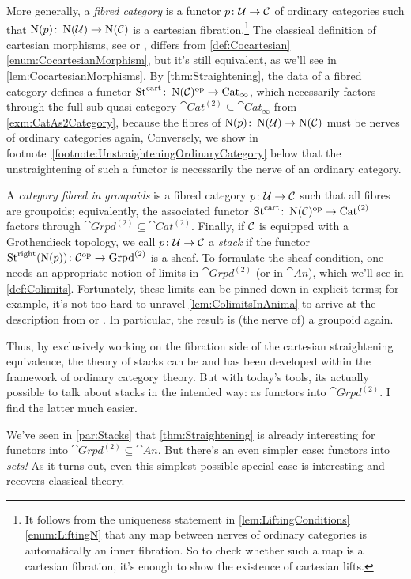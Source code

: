 \begin{numpar}
	More generally, a \emph{fibred category} is a functor $p\colon \mathcal{U}\rightarrow \mathcal{C}$ of ordinary categories such that $\operatorname{N}(p)\colon \operatorname{N}(\mathcal{U})\rightarrow\operatorname{N}(\mathcal{C})$ is a cartesian fibration.\footnote{It follows from the uniqueness statement in \cref{lem:LiftingConditions}\cref{enum:LiftingN} that any map between nerves of ordinary categories is automatically an inner fibration. So to check whether such a map is a cartesian fibration, it's enough to show the existence of cartesian lifts.} The classical definition of cartesian morphisms, see \cite[Definition~3.1.1]{OlssonStacks} or \cite[]{Stacks}, differs from \cref{def:Cocartesian}\cref{enum:CocartesianMorphism}, but it's still equivalent, as we'll see in \cref{lem:CocartesianMorphisms}. By \cref{thm:Straightening}, the data of a fibred category defines a functor $\operatorname{St}^{\mathrm{cart}}\colon \operatorname{N}(\mathcal{C})^{\mathrm{op}}\rightarrow \mathrm{Cat}_\infty$, which necessarily factors through the full sub-quasi-category $\cat{Cat}^{(2)}\subseteq \cat{Cat}_\infty$ from \cref{exm:CatAs2Category}, because the fibres of $\operatorname{N}(p)\colon \operatorname{N}(\mathcal{U})\rightarrow\operatorname{N}(\mathcal{C})$ must be nerves of ordinary categories again, Conversely, we show in footnote~\cref{footnote:UnstraighteningOrdinaryCategory} below that the unstraightening of such a functor is necessarily the nerve of an ordinary category.
	
	A \emph{category fibred in groupoids} is a fibred category $p\colon \mathcal{U}\rightarrow \mathcal{C}$ such that all fibres are groupoids; equivalently, the associated functor $\operatorname{St}^{\mathrm{cart}}\colon \operatorname{N}(\mathcal{C})^{\mathrm{op}}\rightarrow \mathrm{Cat}^{(2)}$ factors through $\cat{Grpd}^{(2)}\subseteq \cat{Cat}^{(2)}$. Finally, if $\mathcal{C}$ is equipped with a Grothendieck topology, we call $p\colon \mathcal{U}\rightarrow \mathcal{C}$ a \emph{stack} if the functor $\operatorname{St}^{\mathrm{right}}(\operatorname{N}(p))\colon \mathcal{C}^{\mathrm{op}}\rightarrow \mathrm{Grpd}^{(2)}$ is a sheaf. To formulate the sheaf condition, one needs an appropriate notion of limits in $\cat{Grpd}^{(2)}$ (or in $\cat{An}$), which we'll see in \cref{def:Colimits}. Fortunately, these limits can be pinned down in explicit terms; for example, it's not too hard to unravel \cref{lem:ColimitsInAnima} to arrive at the description from \cite[\S4.2]{OlssonStacks} or \cite[]{Stacks}. In particular, the result is (the nerve of) a groupoid again.
	
	Thus, by exclusively working on the fibration side of the cartesian straightening equivalence, the theory of stacks can be and has been developed within the framework of ordinary category theory. But with today's tools, its actually possible to talk about stacks in the intended way: as functors into $\cat{Grpd}^{(2)}$. I find the latter much easier.
\end{numpar}
We've seen in \cref{par:Stacks} that \cref{thm:Straightening} is already interesting for functors into $\cat{Grpd}^{(2)}\subseteq \cat{An}$. But there's an even simpler case: functors into \emph{sets!} As it turns out, even this simplest possible special case is interesting and recovers classical theory.

